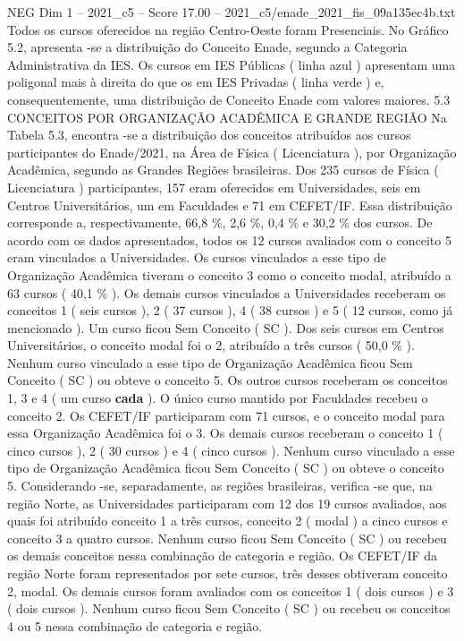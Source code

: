 \begin{textsample}{NEG Dim 1 – 2021\_c5 – Score 17.00 – 2021\_c5/enade\_2021\_fis\_09a135ec4b.txt}
Todos os cursos oferecidos na região Centro-Oeste foram Presenciais.
No Gráfico 5.2, apresenta -se a distribuição do Conceito Enade, segundo a Categoria Administrativa da IES.
Os cursos em IES Públicas ( linha azul ) apresentam uma poligonal mais à direita do que os em IES Privadas ( linha verde ) e, consequentemente, uma distribuição de Conceito Enade com valores maiores. 5.3 CONCEITOS POR ORGANIZAÇÃO ACADÊMICA E GRANDE REGIÃO Na Tabela 5.3, encontra -se a distribuição dos conceitos atribuídos aos cursos participantes do Enade/2021, na Área de Física ( Licenciatura ), por Organização Acadêmica, segundo as Grandes Regiões brasileiras.
Dos 235 cursos de Física ( Licenciatura ) participantes, 157 eram oferecidos em Universidades, seis em Centros Universitários, um em Faculdades e 71 em CEFET/IF.
Essa distribuição corresponde a, respectivamente, 66,8 \%, 2,6 \%, 0,4 \% e 30,2 \% dos cursos.
De acordo com os dados apresentados, todos os 12 cursos avaliados com o conceito 5 eram vinculados a Universidades.
Os cursos vinculados a esse tipo de Organização Acadêmica tiveram o conceito 3 como o conceito modal, atribuído a 63 cursos ( 40,1 \% ).
Os demais cursos vinculados a Universidades receberam os conceitos 1 ( seis cursos ), 2 ( 37 cursos ), 4 ( 38 cursos ) e 5 ( 12 cursos, como já mencionado ).
Um curso ficou Sem Conceito ( SC ).
Dos seis cursos em Centros Universitários, o conceito modal foi o 2, atribuído a três cursos ( 50,0 \% ).
Nenhum curso vinculado a esse tipo de Organização Acadêmica ficou Sem Conceito ( SC ) ou obteve o conceito 5.
Os outros cursos receberam os conceitos 1, 3 e 4 ( um curso \textbf{cada} ).
O único curso mantido por Faculdades recebeu o conceito 2.
Os CEFET/IF participaram com 71 cursos, e o conceito modal para essa Organização Acadêmica foi o 3.
Os demais cursos receberam o conceito 1 ( cinco cursos ), 2 ( 30 cursos ) e 4 ( cinco cursos ).
Nenhum curso vinculado a esse tipo de Organização Acadêmica ficou Sem Conceito ( SC ) ou obteve o conceito 5.
Considerando -se, separadamente, as regiões brasileiras, verifica -se que, na região Norte, as Universidades participaram com 12 dos 19 cursos avaliados, aos quais foi atribuído conceito 1 a três cursos, conceito 2 ( modal ) a cinco cursos e conceito 3 a quatro cursos.
Nenhum curso ficou Sem Conceito ( SC ) ou recebeu os demais conceitos nessa combinação de categoria e região.
Os CEFET/IF da região Norte foram representados por sete cursos, três desses obtiveram conceito 2, modal.
Os demais cursos foram avaliados com os conceitos 1 ( dois cursos ) e 3 ( dois cursos ).
Nenhum curso ficou Sem Conceito ( SC ) ou recebeu os conceitos 4 ou 5 nessa combinação de categoria e região.

\end{textsample}
